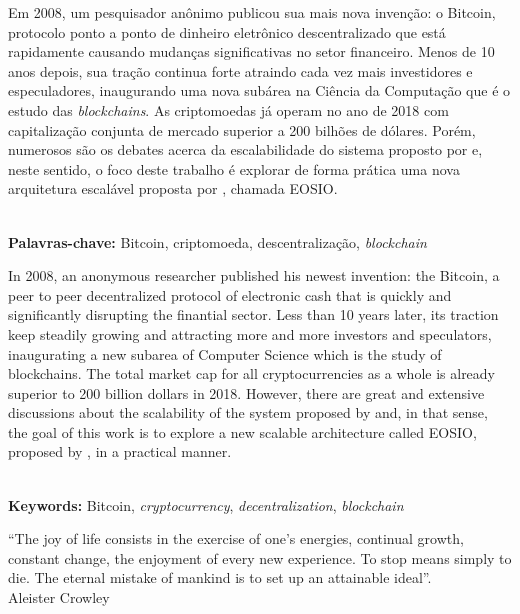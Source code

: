 \documentclass[a4paper,12pt]{monografia}
\theoremstyle{plain}
\theoremstyle{definition}
\theoremstyle{remark}
\begin{document}



Em 2008, um pesquisador an\^onimo publicou sua mais nova inven\c{c}\~ao: o Bitcoin, protocolo ponto a ponto de dinheiro eletr\^onico descentralizado que est\'a rapidamente causando mudan\c{c}as significativas no setor financeiro.
Menos de 10 anos depois, sua tra\c{c}\~ao continua forte atraindo cada vez mais investidores e especuladores, inaugurando uma nova sub\'area na Ci\^encia da Computa\c{c}\~ao que \'e o estudo das \textit{blockchains}.
As criptomoedas j\'a operam no ano de 2018 com capitaliza\c{c}\~ao conjunta de mercado superior a 200 bilh\~oes de d\'olares.
Por\'{e}m, numerosos s\~{a}o os debates acerca da escalabilidade do sistema proposto por  e, neste sentido, o foco deste trabalho \'e explorar de forma pr\'atica uma nova arquitetura escal\'{a}vel proposta por , chamada EOSIO.

\noindent \\ \textbf{Palavras-chave:} Bitcoin, criptomoeda, descentraliza\c{c}\~ao, \textit{blockchain}

In 2008, an anonymous researcher published his newest invention: the Bitcoin, a peer to peer decentralized protocol of electronic cash that is quickly and significantly disrupting the finantial sector.
Less than 10 years later, its traction keep steadily growing and attracting more and more investors and speculators, inaugurating a new subarea of Computer Science which is the study of blockchains.
The total market cap for all cryptocurrencies as a whole is already superior to 200 billion dollars in 2018.
However, there are great and extensive discussions about the scalability of the system proposed by  and, in that sense, the goal of this work is to explore a new scalable architecture called EOSIO, proposed by , in a practical manner.

\noindent \\ \textbf{Keywords:} Bitcoin, \textit{cryptocurrency}, \textit{decentralization}, \textit{blockchain}


\newpage

\begin{epigrafe}
``The joy of life consists in the exercise of one’s energies, continual growth, constant change, the enjoyment of every new experience. To stop means simply to die. The eternal mistake of mankind is to set up an attainable ideal''.\\
\hfill Aleister Crowley
\end{epigrafe}
\end{document}
